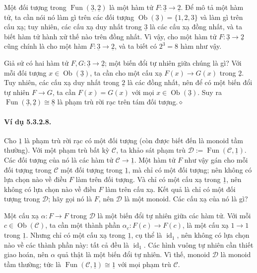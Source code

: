 Một đối tượng trong $\operatorname{Fun}(\underline{3},\underline{2})$ là một hàm tử $F:\underline{3}\to\underline{2}$. Để mô tả một hàm tử, ta cần nói nó làm gì trên các đối tượng $\operatorname{Ob}(\underline{3})=\{1,2,3\}$ và làm gì trên cấu xạ; tuy nhiên, các cấu xạ duy nhất trong $\underline{3}$ là các cấu xạ đồng nhất, và ta biết hàm tử hành xử thế nào trên đồng nhất. Vì vậy, cho một hàm tử $F:\underline{3}\to\underline{2}$ cũng chính là cho một hàm $F:\underline{3}\to\underline{2}$, và ta biết có $2^3=8$ hàm như vậy.

Giả sử có hai hàm tử $F,G:\underline{3}\to\underline{2}$; một biến đổi tự nhiên giữa chúng là gì? Với mỗi đối tượng $x\in\operatorname{Ob}(\underline{3})$, ta cần cho một cấu xạ $F(x)\to G(x)$ trong $\underline{2}$. Tuy nhiên, các cấu xạ duy nhất trong $\underline{2}$ là các đồng nhất, nên để có một biến đổi tự nhiên $F\to G$, ta cần $F(x)=G(x)$ với mọi $x\in\operatorname{Ob}(\underline{3})$. Suy ra $\operatorname{Fun}(\underline{3},\underline{2})\cong\underline{8}$ là phạm trù rời rạc trên tám đối tượng.\hfill$\diamond$
\paragraph{Ví dụ 5.3.2.8.} Cho $\underline{1}$ là phạm trù rời rạc có một đối tượng (còn được biết đến là monoid tầm thường). Với một phạm trù bất kỳ $\mathcal C$, ta khảo sát phạm trù $\mathcal D:=\operatorname{Fun}(\mathcal C,\underline{1})$. Các đối tượng của nó là các hàm tử $\mathcal C\to\underline{1}$. Một hàm tử $F$ như vậy gán cho mỗi đối tượng trong $\mathcal C$ một đối tượng trong $\underline{1}$, mà chỉ có một đối tượng; nên không có lựa chọn nào về điều $F$ làm trên đối tượng. Và chỉ có một cấu xạ trong $\underline{1}$, nên không có lựa chọn nào về điều $F$ làm trên cấu xạ. Kết quả là chỉ có một đối tượng trong $\mathcal D$; hãy gọi nó là $F$, nên $\mathcal D$ là một monoid. Các cấu xạ của nó là gì?

Một cấu xạ $\alpha:F\to F$ trong $\mathcal D$ là một biến đổi tự nhiên giữa các hàm tử. Với mỗi $c\in\operatorname{Ob}(\mathcal C)$, ta cần một thành phần $\alpha_c:F(c)\to F(c)$, là một cấu xạ $1\to1$ trong $\underline{1}$. Nhưng chỉ có một cấu xạ trong $\underline{1}$, cụ thể là $\operatorname{id}_1$, nên không có lựa chọn nào về các thành phần này: tất cả đều là $\operatorname{id}_1$. Các hình vuông tự nhiên cần thiết giao hoán, nên $\alpha$ quả thật là một biến đổi tự nhiên. Vì thế, monoid $\mathcal D$ là monoid tầm thường; tức là $\operatorname{Fun}(\mathcal C,\underline{1})\cong\underline{1}$ với mọi phạm trù $\mathcal C$.

